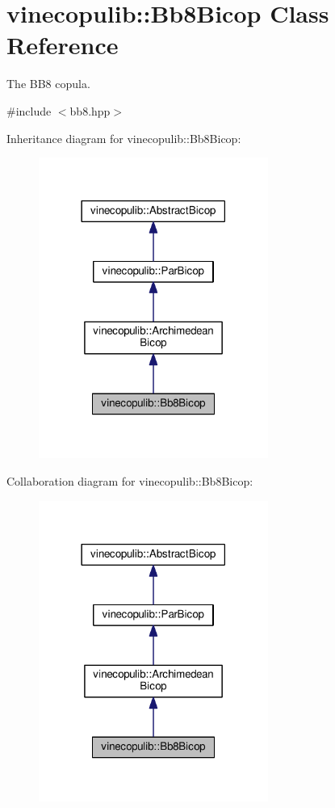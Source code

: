 \hypertarget{classvinecopulib_1_1_bb8_bicop}{}\section{vinecopulib\+:\+:Bb8\+Bicop Class Reference}
\label{classvinecopulib_1_1_bb8_bicop}


The B\+B8 copula.  




{\ttfamily \#include $<$bb8.\+hpp$>$}



Inheritance diagram for vinecopulib\+:\+:Bb8\+Bicop\+:
\nopagebreak
\begin{figure}[H]
\begin{center}
\leavevmode
\includegraphics[width=213pt]{classvinecopulib_1_1_bb8_bicop__inherit__graph}
\end{center}
\end{figure}


Collaboration diagram for vinecopulib\+:\+:Bb8\+Bicop\+:
\nopagebreak
\begin{figure}[H]
\begin{center}
\leavevmode
\includegraphics[width=213pt]{classvinecopulib_1_1_bb8_bicop__coll__graph}
\end{center}
\end{figure}
